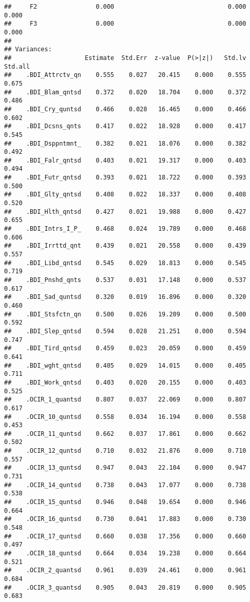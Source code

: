 \documentclass[]{article}
\begin{document}
\begin{verbatim}
##     F2                0.000                               0.000    0.000
##     F3                0.000                               0.000    0.000
## 
## Variances:
##                    Estimate  Std.Err  z-value  P(>|z|)   Std.lv  Std.all
##    .BDI_Attrctv_qn    0.555    0.027   20.415    0.000    0.555    0.675
##    .BDI_Blam_qntsd    0.372    0.020   18.704    0.000    0.372    0.486
##    .BDI_Cry_quntsd    0.466    0.028   16.465    0.000    0.466    0.602
##    .BDI_Dcsns_qnts    0.417    0.022   18.928    0.000    0.417    0.545
##    .BDI_Dsppntmnt_    0.382    0.021   18.076    0.000    0.382    0.492
##    .BDI_Falr_qntsd    0.403    0.021   19.317    0.000    0.403    0.494
##    .BDI_Futr_qntsd    0.393    0.021   18.722    0.000    0.393    0.500
##    .BDI_Glty_qntsd    0.408    0.022   18.337    0.000    0.408    0.520
##    .BDI_Hlth_qntsd    0.427    0.021   19.988    0.000    0.427    0.655
##    .BDI_Intrs_I_P_    0.468    0.024   19.789    0.000    0.468    0.606
##    .BDI_Irrttd_qnt    0.439    0.021   20.558    0.000    0.439    0.557
##    .BDI_Libd_qntsd    0.545    0.029   18.813    0.000    0.545    0.719
##    .BDI_Pnshd_qnts    0.537    0.031   17.148    0.000    0.537    0.617
##    .BDI_Sad_quntsd    0.320    0.019   16.896    0.000    0.320    0.460
##    .BDI_Stsfctn_qn    0.500    0.026   19.209    0.000    0.500    0.592
##    .BDI_Slep_qntsd    0.594    0.028   21.251    0.000    0.594    0.747
##    .BDI_Tird_qntsd    0.459    0.023   20.059    0.000    0.459    0.641
##    .BDI_wght_qntsd    0.405    0.029   14.015    0.000    0.405    0.711
##    .BDI_Work_qntsd    0.403    0.020   20.155    0.000    0.403    0.525
##    .OCIR_1_quantsd    0.807    0.037   22.069    0.000    0.807    0.617
##    .OCIR_10_quntsd    0.558    0.034   16.194    0.000    0.558    0.453
##    .OCIR_11_quntsd    0.662    0.037   17.861    0.000    0.662    0.502
##    .OCIR_12_quntsd    0.710    0.032   21.876    0.000    0.710    0.557
##    .OCIR_13_quntsd    0.947    0.043   22.104    0.000    0.947    0.731
##    .OCIR_14_quntsd    0.738    0.043   17.077    0.000    0.738    0.538
##    .OCIR_15_quntsd    0.946    0.048   19.654    0.000    0.946    0.664
##    .OCIR_16_quntsd    0.730    0.041   17.883    0.000    0.730    0.548
##    .OCIR_17_quntsd    0.660    0.038   17.356    0.000    0.660    0.497
##    .OCIR_18_quntsd    0.664    0.034   19.238    0.000    0.664    0.521
##    .OCIR_2_quantsd    0.961    0.039   24.461    0.000    0.961    0.684
##    .OCIR_3_quantsd    0.905    0.043   20.819    0.000    0.905    0.683

\end{verbatim}
\end{document}
